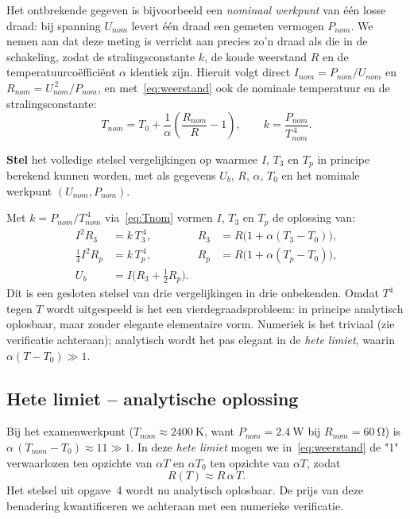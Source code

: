 \documentclass[addpoints,11pt,a4paper]{exam}
\begin{document}
\begin{questions}
\newpage
Het ontbrekende gegeven is bijvoorbeeld een \emph{nominaal werkpunt} van \'e\'en losse draad: bij spanning $U_{nom}$ levert \'e\'en draad een gemeten vermogen $P_{nom}$. We nemen aan dat deze meting is verricht aan precies zo'n draad als die in de schakeling, zodat de stralingsconstante $k$, de koude weerstand $R$ en de temperatuurco\"effici\"ent $\alpha$ identiek zijn. Hieruit volgt direct $I_{nom} = P_{nom}/U_{nom}$ en $R_{nom} = U_{nom}^{\,2}/P_{nom}$, en met~\eqref{eq:weerstand} ook de nominale temperatuur en de stralingsconstante:
\begin{equation}
T_{nom} = T_0 + \frac{1}{\alpha}\!\left(\frac{R_{nom}}{R} - 1\right),
\qquad k = \frac{P_{nom}}{T_{nom}^{\,4}}.
\label{eq:Tnom}
\end{equation}

\question[6]
\textbf{Stel} het volledige stelsel vergelijkingen op waarmee $I$, $T_3$ en $T_p$ in principe berekend kunnen worden, met als gegevens $U_b$, $R$, $\alpha$, $T_0$ en het nominale werkpunt $(U_{nom}, P_{nom})$.

\begin{solution}
Met $k = P_{nom}/T_{nom}^{\,4}$ via~\eqref{eq:Tnom} vormen $I$, $T_3$ en $T_p$ de oplossing van:
\begin{align*}
I^{2} R_3 &= k\,T_3^{\,4}, & R_3 &= R\bigl(1+\alpha(T_3-T_0)\bigr),\\
\tfrac{1}{4}I^{2} R_p &= k\,T_p^{\,4}, & R_p &= R\bigl(1+\alpha(T_p-T_0)\bigr),\\
U_b &= I\bigl(R_3 + \tfrac{1}{2}R_p\bigr). &&
\end{align*}
Dit is een gesloten stelsel van drie vergelijkingen in drie onbekenden. Omdat $T^4$ tegen $T$ wordt uitgespeeld is het een vierdegraadsprobleem: in principe analytisch oplosbaar, maar zonder elegante elementaire vorm. Numeriek is het triviaal (zie verificatie achteraan); analytisch wordt het pas elegant in de \emph{hete limiet}, waarin $\alpha(T - T_0) \gg 1$.
\end{solution}

\newpage
\subsection*{Hete limiet -- analytische oplossing}

Bij het examenwerkpunt ($T_{nom} \approx \qty{2400}{\K}$, want $P_{nom} = \qty{2.4}{\W}$ bij $R_{nom} = \qty{60}{\ohm}$) is $\alpha\,(T_{nom} - T_0) \approx 11 \gg 1$. In deze \emph{hete limiet} mogen we in~\eqref{eq:weerstand} de "1" verwaarlozen ten opzichte van $\alpha T$ en $\alpha T_0$ ten opzichte van $\alpha T$, zodat
\[
R(T) \approx R\,\alpha\,T.
\]
Het stelsel uit opgave~4 wordt nu analytisch oplosbaar. De prijs van deze benadering kwantificeren we achteraan met een numerieke verificatie.


\end{questions}
\end{document}
